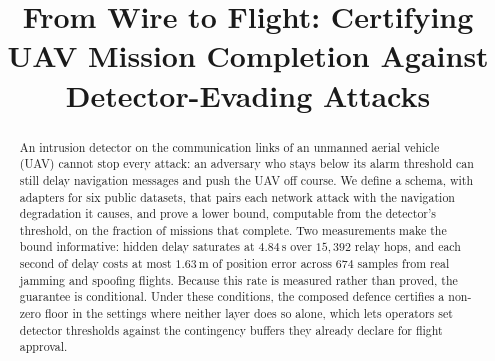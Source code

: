\documentclass[conference,letterpaper,10pt]{IEEEtran}   %
\newif\ifanon
\begin{document}
\title{From Wire to Flight: Certifying UAV Mission Completion Against Detector-Evading Attacks}


\ifanon
  \author{\IEEEauthorblockN{Paper \#XXX}
  \IEEEauthorblockA{Submitted for double-blind review}}
\else
  \author{
  }
\fi

\maketitle



\begin{abstract}
An intrusion detector on the communication links of an unmanned aerial vehicle
(UAV) cannot stop every attack: an adversary who stays below its alarm threshold
can still delay navigation messages and push the UAV off course. We define a
schema, with adapters for six public datasets, that pairs each network attack
with the navigation degradation it causes, and prove a lower bound, computable
from the detector's threshold, on the fraction of missions that complete. Two measurements make the bound
informative: hidden delay saturates at $4.84$\,s over $15{,}392$ relay hops,
and each second of delay costs at most $1.63$\,m of position error across $674$
samples from real jamming and spoofing flights. Because this rate is measured
rather than proved, the guarantee is conditional. Under these conditions, the
composed defence certifies a non-zero floor in the settings where neither layer
does so alone, which lets operators set detector thresholds against the
contingency buffers they already declare for flight approval.
\end{abstract}
\end{document}
